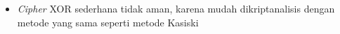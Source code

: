 \documentclass{article}
\begin{document}

\begin{itemize}
  \item \textit{Cipher} XOR sederhana tidak aman, karena mudah dikriptanalisis dengan metode yang sama seperti metode Kasiski
\end{itemize}
\end{document}
